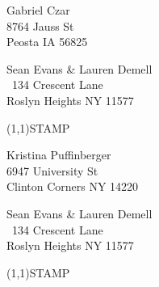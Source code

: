 \documentclass[12pt]{article}
\begin{document}
\begin{center} \begin{Huge} \vspace*{\fill}
Gabriel Czar\\
8764 Jauss St\\
Peosta IA 56825\\
\vspace{\fill} \end{Huge} \end{center}

\clearpage

\begin{minipage}{.5\linewidth} \noindent
Sean Evans \& Lauren Demell\\\ 
134 Crescent Lane\\ 
Roslyn Heights NY 11577
\end{minipage}
\begin{minipage}{.5\linewidth \hspace{-.2in} \vspace{-.3in}}
\begin{flushright}
\framebox(1,1){STAMP}
\end{flushright}
\end{minipage}

\begin{center} \begin{Huge} \vspace*{\fill}
Kristina Puffinberger\\
6947 University St\\
Clinton Corners NY 14220\\
\vspace{\fill} \end{Huge} \end{center}

\clearpage

\begin{minipage}{.5\linewidth} \noindent
Sean Evans \& Lauren Demell\\\ 
134 Crescent Lane\\ 
Roslyn Heights NY 11577
\end{minipage}
\begin{minipage}{.5\linewidth \hspace{-.2in} \vspace{-.3in}}
\begin{flushright}
\framebox(1,1){STAMP}
\end{flushright}
\end{minipage}
\end{document}
